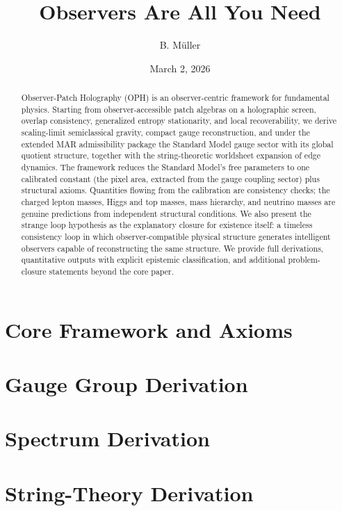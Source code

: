 \documentclass[11pt]{article}
\title{Observers Are All You Need}
\author{B. M\"uller}
\date{March 2, 2026}
\begin{document}
\maketitle

\begin{abstract}
Observer-Patch Holography (OPH) is an observer-centric framework for fundamental physics. Starting from observer-accessible patch algebras on a holographic screen, overlap consistency, generalized entropy stationarity, and local recoverability, we derive scaling-limit semiclassical gravity, compact gauge reconstruction, and under the extended MAR admissibility package the Standard Model gauge sector with its global quotient structure, together with the string-theoretic worldsheet expansion of edge dynamics. The framework reduces the Standard Model's free parameters to one calibrated constant (the pixel area, extracted from the gauge coupling sector) plus structural axioms. Quantities flowing from the calibration are consistency checks; the charged lepton masses, Higgs and top masses, mass hierarchy, and neutrino masses are genuine predictions from independent structural conditions. We also present the strange loop hypothesis as the explanatory closure for existence itself: a timeless consistency loop in which observer-compatible physical structure generates intelligent observers capable of reconstructing the same structure. We provide full derivations, quantitative outputs with explicit epistemic classification, and additional problem-closure statements beyond the core paper.
\end{abstract}

\tableofcontents
\newpage

\part{Core Framework and Axioms}


\clearpage
\part{Gauge Group Derivation}


\clearpage
\part{Spectrum Derivation}


\clearpage
\part{String-Theory Derivation}

\end{document}
